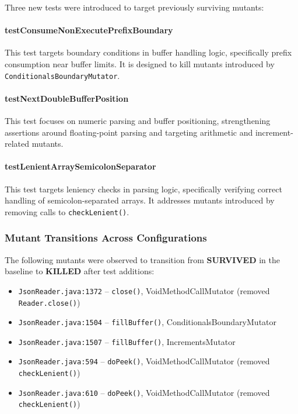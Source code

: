 \documentclass[11pt]{article}
\begin{document}
Three new tests were introduced to target previously surviving mutants:

\paragraph{testConsumeNonExecutePrefixBoundary}
This test targets boundary conditions in buffer handling logic, specifically prefix consumption near buffer limits. It is designed to kill mutants introduced by \texttt{ConditionalsBoundaryMutator}.

\paragraph{testNextDoubleBufferPosition}
This test focuses on numeric parsing and buffer positioning, strengthening assertions around floating-point parsing and targeting arithmetic and increment-related mutants.

\paragraph{testLenientArraySemicolonSeparator}
This test targets leniency checks in parsing logic, specifically verifying correct handling of semicolon-separated arrays. It addresses mutants introduced by removing calls to \texttt{checkLenient()}.

\subsubsection{Mutant Transitions Across Configurations}

The following mutants were observed to transition from \textbf{SURVIVED} in the baseline to \textbf{KILLED} after test additions:

\begin{itemize}
\item \texttt{JsonReader.java:1372} -- \texttt{close()}, VoidMethodCallMutator (removed \texttt{Reader.close()})
\item \texttt{JsonReader.java:1504} -- \texttt{fillBuffer()}, ConditionalsBoundaryMutator
\item \texttt{JsonReader.java:1507} -- \texttt{fillBuffer()}, IncrementsMutator
\item \texttt{JsonReader.java:594} -- \texttt{doPeek()}, VoidMethodCallMutator (removed \texttt{checkLenient()})
\item \texttt{JsonReader.java:610} -- \texttt{doPeek()}, VoidMethodCallMutator (removed \texttt{checkLenient()})
\end{itemize}
\end{document}
